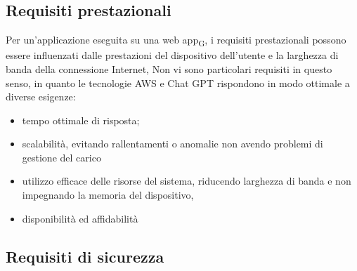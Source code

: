 \documentclass{article}
\begin{document}
\subsection{Requisiti prestazionali}
Per un'applicazione eseguita su una web app\textsubscript{G}, i requisiti prestazionali possono essere influenzati dalle prestazioni del dispositivo dell'utente e la larghezza di banda della connessione Internet, Non vi sono particolari requisiti in questo senso, in quanto le tecnologie AWS e Chat GPT rispondono in modo ottimale a diverse esigenze:
\begin{itemize}
\item tempo ottimale di risposta;
\item scalabilità, evitando rallentamenti o anomalie non avendo problemi di gestione del carico 
\item utilizzo efficace delle risorse del sistema, riducendo larghezza di banda e non impegnando la memoria del dispositivo, 
\item disponibilità ed affidabilità
\end{itemize}

\subsection{Requisiti di sicurezza}







   
\end{document}
